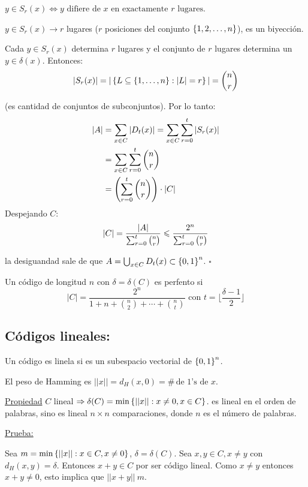 \documentclass[12pt,a4paper]{article}
\begin{document}
$y\in S_{r}(x) \iff y\,\, \text{difiere de $x$ en exactamente $r$ lugares}$.
\medskip

$y\in S_{r}(x) \to r$ lugares ($r$ posiciones del conjunto $\left\lbrace 1,2, \ldots, n \right\rbrace$), 
es un biyección.
\medskip

Cada $y\in S_{r}(x)$ determina $r$ lugares y el conjunto de $r$ lugares determina 
un $y\in \delta(x)$. Entonces:
$$|S_{r}(x)| = |\left\lbrace L \subseteq \left\lbrace 1,\ldots,n \right\rbrace:|L|=r \right\rbrace| = \binom{n}{r}$$

(es cantidad de conjuntos de subconjuntos). Por lo tanto:
\begin{align*}
    |A| &= \sum_{x\in C} |D_{t}(x)| = \sum_{x\in C} \sum_{r=0}^{t} |S_{r}(x)|\\
    &= \sum_{x\in C} \sum_{r=0}^{t} \binom{n}{r}\\
    &= \left(\sum_{r=0}^{t} \binom{n}{r}\right) \cdot |C|\\
\end{align*}
Despejando $C$:
$$|C| = \frac{|A|}{\sum_{r=0}^{t} \binom{n}{r}}\leqslant \frac{2^{n}}{\sum_{r=0}^{t} \binom{n}{r}}$$

la desiguandad sale de que $A = \bigcup_{x\in C} D_{t}(x) \subset \left\lbrace 0,1 \right\rbrace^{n}$.
$\square$

\begin{definition} Un código de longitud $n$ con $\delta = \delta(C)$ es perfento si
    $$|C| = \frac{2^{n}}{1+n+ \binom{n}{2} + \cdots + \binom{n}{t}}\,\,\text{con}\,\, t = \lfloor \frac{\delta -1}{2} \rfloor$$
\end{definition}

\subsection{Códigos lineales:}

Un código es linela si es un subespacio vectorial de $\left\lbrace 0,1 \right\rbrace^{n}$.

\begin{definition} El peso de Hamming es $||x||=d_{H}(x,0)=\# \, \text{de 1's de $x$}$.
\end{definition}

\underline{Propiedad} $C$ lineal $\Rightarrow \delta(C) = \min \left\lbrace ||x||: x\neq 0, x\in C \right\rbrace$.
es lineal en el orden de palabras, sino es lineal $n\times n$ comparaciones, donde 
$n$ es el número de palabras.
\medskip

\underline{Prueba:}
\medskip

Sea $m = \min \left\lbrace ||x|| :x\in C, x\neq 0 \right\rbrace$, $\delta= \delta(C)$.
Sea $x,y \in C, x\neq y$ con $d_{H}(x,y) = \delta$. Entonces $x+y\in C$ por ser 
código lineal. Como $x\neq y$ entonces $x+y\neq 0$, esto implica que $||x+y||\> m$.
\medskip
\end{document}
